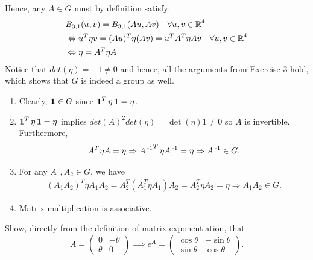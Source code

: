 \documentclass[11pt,onecolumn]{article}
\newcommand{\bl}{B_{3,1}}
\begin{document}
\begin{answer}
Hence, any $A \in G$ must by definition satisfy:
\begin{align*}
    &\bl(u,v) = \bl(Au,Av) \quad \forall u,v \in \real^4 \\
    &\Leftrightarrow u^T\eta v = (Au)^T\eta (Av) = u^TA^T\eta Av \quad \forall u,v \in \real^4 \\
    &\Leftrightarrow \eta = A^T \eta A 
\end{align*}
Notice that $det(\eta) = -1 \neq 0$ and hence, all the arguments from Exercise 3 hold, which shows that $G$ is indeed a group as well.
\begin{enumerate}
    \item Clearly, $\operatorname{\mathbf{1}} \in G$ since $\operatorname{\mathbf{1}}^T \eta \operatorname{\mathbf{1}} = \eta$.
    \item $\operatorname{\mathbf{1}}^T \eta \operatorname{\mathbf{1}} = \eta$ implies $det(A)^2 det(\eta) = \det(\eta) 1 \neq 0$ so $A$ is invertible. Furthermore,
    \begin{align*}
        A^T \eta A = \eta \Rightarrow A\operatorname{^{-1}}^T \eta A\operatorname{^{-1}} = \eta \Rightarrow A\operatorname{^{-1}} \in G.
    \end{align*}
    \item For any $A_1,A_2 \in G$, we have 
    \begin{align*}
        (A_1A_2)^T \eta A_1A_2 = A_2^T(A_1^T\eta A_1)A_2 = A_2^T \eta A_2 = \eta \Rightarrow A_1A_2 \in G.
    \end{align*}
    \item Matrix multiplication is associative.
\end{enumerate}
\end{answer}
\begin{exercise}
 Show, directly from the definition of matrix exponentiation, that $$A=\begin{pmatrix} 0 &− \theta\\ \theta & 0 \end{pmatrix} \implies e^A =\begin{pmatrix} \cos{\theta} & −\sin{\theta}\\ \sin{\theta} & \cos{\theta}\end{pmatrix}.$$
\end{exercise}
\end{document}
